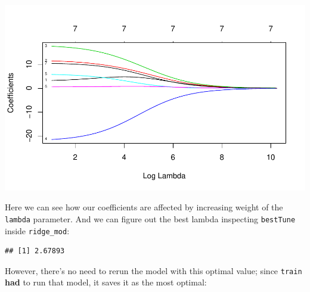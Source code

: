 \documentclass[
]{book}
\newenvironment{Shaded}{\begin{snugshade}}{\end{snugshade}}
\newcommand{\DataTypeTok}[1]{\textcolor[rgb]{0.13,0.29,0.53}{#1}}
\newcommand{\KeywordTok}[1]{\textcolor[rgb]{0.13,0.29,0.53}{\textbf{#1}}}
\newcommand{\NormalTok}[1]{#1}
\newcommand{\OperatorTok}[1]{\textcolor[rgb]{0.81,0.36,0.00}{\textbf{#1}}}
\newcommand{\StringTok}[1]{\textcolor[rgb]{0.31,0.60,0.02}{#1}}
\begin{document}
\begin{center}\includegraphics[width=0.8\linewidth]{./figs/unnamed-chunk-5-1} \end{center}

Here we can see how our coefficients are affected by increasing weight of the \texttt{lambda} parameter. And we can figure out the best lambda inspecting \texttt{bestTune} inside \texttt{ridge\_mod}:

\begin{Shaded}
\end{Shaded}

\begin{verbatim}
## [1] 2.67893
\end{verbatim}

However, there's no need to rerun the model with this optimal value; since \texttt{train} \textbf{had} to run that model, it saves it as the most optimal:

\begin{Shaded}
\end{Shaded}
\end{document}

